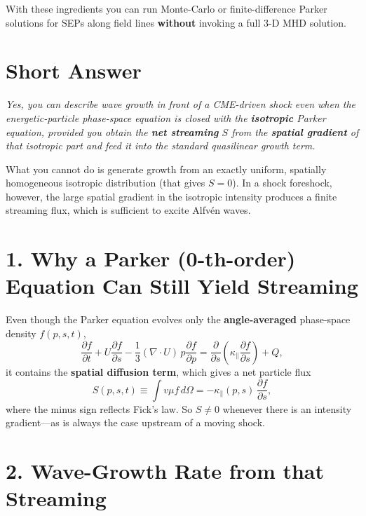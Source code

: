 With these ingredients you can run Monte-Carlo or finite-difference Parker solutions for SEPs along field lines \textbf{without} invoking a full 3-D MHD solution.



\section*{Short Answer}

\textit{Yes, you can describe wave growth in front of a CME-driven shock even when the energetic-particle phase-space equation is closed with the \textbf{isotropic} Parker equation, provided you obtain the \textbf{net streaming} $S$ from the \textbf{spatial gradient} of that isotropic part and feed it into the standard quasilinear growth term.}

What you cannot do is generate growth from an exactly uniform, spatially homogeneous isotropic distribution (that gives $S=0$). In a shock foreshock, however, the large spatial gradient in the isotropic intensity produces a finite streaming flux, which is sufficient to excite Alfvén waves.

\section*{1. Why a Parker (0-th-order) Equation Can Still Yield Streaming}

Even though the Parker equation evolves only the \textbf{angle-averaged} phase-space density $f(p, s, t)$,
\begin{equation}
\frac{\partial f}{\partial t}
+ U \frac{\partial f}{\partial s}
- \frac{1}{3} (\nabla \cdot U) \, p \frac{\partial f}{\partial p}
= \frac{\partial}{\partial s} \left( \kappa_{\parallel} \frac{\partial f}{\partial s} \right)
+ Q,
\tag{1}
\end{equation}
it contains the \textbf{spatial diffusion term}, which gives a net particle flux
\begin{equation}
S(p, s, t) \equiv \int v \mu f \, d\Omega
= - \kappa_{\parallel}(p, s) \, \frac{\partial f}{\partial s},
\tag{2}
\end{equation}
where the minus sign reflects Fick’s law. So $S \neq 0$ whenever there is an intensity gradient—as is always the case upstream of a moving shock.

\section*{2. Wave-Growth Rate from that Streaming}

